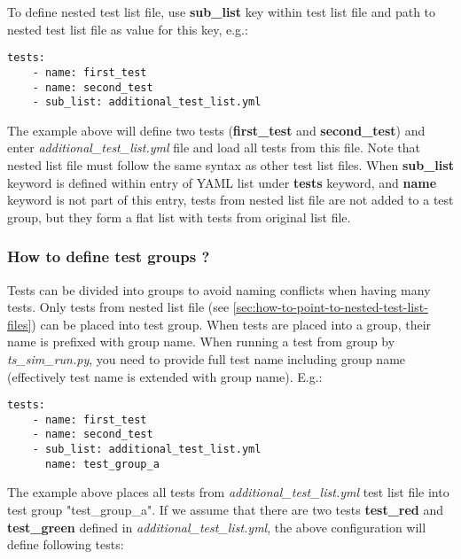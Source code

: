 \documentclass{tropic_design_spec}
\begin{document}
To define nested test list file, use \textbf{sub_list} key within test list file and
path to nested test list file as value for this key, e.g.:

\begin{lstlisting}
tests:
    - name: first_test
    - name: second_test
    - sub_list: additional_test_list.yml
\end{lstlisting}

The example above will define two tests (\textbf{first_test} and \textbf{second_test})
and enter \textit{additional_test_list.yml} file and load all tests from this file.
Note that nested list file must follow the same syntax as other test list files.
When \textbf{sub_list} keyword is defined within entry of YAML list under \textbf{tests}
keyword, and \textbf{name} keyword is not part of this entry, tests from nested
list file are not added to a test group, but they form a flat list with tests from
original list file.



\subsubsection{How to define test groups ?}
\label{sec:how-to-define-test-groups}

Tests can be divided into groups to avoid naming conflicts when having many tests.
Only tests from nested list file (see \ref{sec:how-to-point-to-nested-test-list-files})
can be placed into test group. When tests are placed into a group, their name is
prefixed with group name. When running a test from group by \textit{ts_sim_run.py},
you need to provide full test name including group name (effectively test name is
extended with group name). E.g.:

\begin{lstlisting}
tests:
    - name: first_test
    - name: second_test
    - sub_list: additional_test_list.yml
      name: test_group_a
\end{lstlisting}

The example above places all tests from \textit{additional_test_list.yml} test list
file into test group "test_group_a". If we assume that there are two tests
\textbf{test_red} and \textbf{test_green} defined in \textit{additional_test_list.yml},
the above configuration will define following tests:
\end{document}
